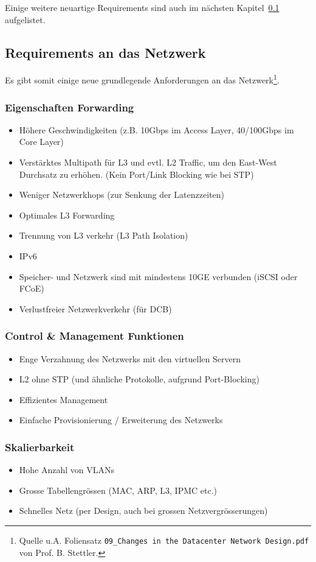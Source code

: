 Einige weitere neuartige Requirements sind auch im nächsten Kapitel~\ref{sec:requirements-an-das-netzwerk} aufgelistet.

\subsection{Requirements an das Netzwerk}\label{sec:requirements-an-das-netzwerk}
Es gibt somit einige neue grundlegende Anforderungen an das Netzwerk\footnote{Quelle u.A. Foliensatz \lstinline|09_Changes in the Datacenter Network Design.pdf| von Prof. B. Stettler.}.
\subsubsection{Eigenschaften Forwarding}
\begin{itemize}
	\item Höhere Geschwindigkeiten (z.B. 10Gbps im Access Layer, 40/100Gbps im Core Layer)
	\item Verstärktes Multipath für L3 und evtl. L2 Traffic, um den East-West Durchsatz zu erhöhen. (Kein Port/Link Blocking wie bei STP)
	\item Weniger Netzwerkhops (zur Senkung der Latenzzeiten)
	\item Optimales L3 Forwarding
	\item Trennung von L3 verkehr (L3 Path Isolation)
	\item IPv6
	\item Speicher- und Netzwerk sind mit mindestens 10GE verbunden (iSCSI oder FCoE)
	\item Verlustfreier Netzwerkverkehr (für DCB)
\end{itemize}

\subsubsection{Control \& Management Funktionen}
\begin{itemize}
	\item Enge Verzahnung des Netzwerks mit den virtuellen Servern
	\item L2 ohne STP (und ähnliche Protokolle, aufgrund Port-Blocking)
	\item Effizientes Management
	\item Einfache Provisionierung / Erweiterung des Netzwerks
\end{itemize}


\subsubsection{Skalierbarkeit}
\begin{itemize}
	\item Hohe Anzahl von VLANs
	\item Grosse Tabellengrössen (MAC, ARP, L3, IPMC etc.)
	\item Schnelles Netz (per Design, auch bei grossen Netzvergrösserungen)
\end{itemize}

